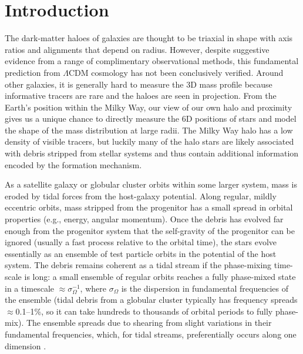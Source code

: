 \documentclass[letterpaper,12pt,preprint]{aastex}
\newcommand{\chchchanges}[1]{{\color{red} {#1}}}
\begin{document}
\keywords{
}

\section{Introduction}\label{sec:introduction}

The dark-matter haloes of galaxies are thought to be triaxial in shape with axis ratios and alignments that depend on radius. However, despite suggestive evidence from a range of complimentary observational methods, this fundamental prediction from $\Lambda$CDM cosmology has not been conclusively verified. Around other galaxies, it is generally hard to measure the 3D mass profile because informative tracers are rare and the haloes are seen in projection. From the Earth's position within the Milky Way, our view of our own halo and proximity gives us a unique chance to directly measure the 6D positions of stars and model the shape of the mass distribution at large radii. The Milky Way halo has a low density of visible tracers, but luckily many of the halo stars are likely associated with debris stripped from stellar systems and thus contain additional information encoded by the formation mechanism.

As a satellite galaxy or globular cluster orbits within some larger system, mass is eroded by tidal forces from the host-galaxy potential. Along regular, mildly eccentric orbits, \chchchanges{mass stripped from the progenitor has a small spread} in orbital properties (e.g., energy, angular momentum). Once the debris has evolved far enough from the progenitor system that the self-gravity of the progenitor can be ignored (usually a fast process relative to the orbital time), the stars evolve essentially as an ensemble of test particle orbits in the potential of the host system. The debris remains coherent as a tidal stream if the phase-mixing time-scale is long: a small ensemble of regular orbits reaches a fully phase-mixed state in a timescale $\approx\sigma_\Omega^{-1}$, where $\sigma_\Omega$ is the dispersion in fundamental frequencies of the ensemble (tidal debris from a globular cluster typically has frequency spreads $\approx$0.1--1\%, so it can take hundreds to thousands of orbital periods to fully phase-mix). The ensemble spreads due to shearing from slight variations in their fundamental frequencies, which, for tidal streams, preferentially occurs along one dimension \citep{merritt96, helmi99}. 
\end{document}
